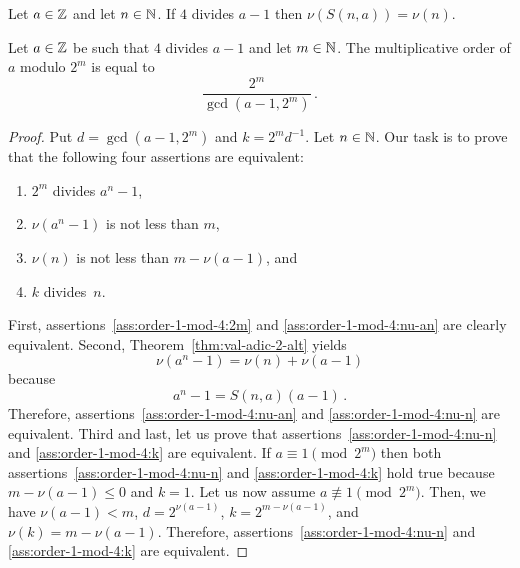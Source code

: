 \begin{theorem} \label{thm:val-adic-2-alt} 
  Let $a \in \mathbb{Z}$ and let $n \in \mathbb{N}$.
  If $4$ divides $a - 1$ then $\nu(S(n, a)) = \nu(n)$.
\end{theorem}



\begin{theorem} \label{thm:order-un-mod-4} 
  Let $a \in \mathbb{Z}$ be such that $4$ divides $a - 1$ and let $m \in \mathbb{N}$.
  The multiplicative order of $a$ modulo $2^m$ is equal to
  $$
  \frac{2^m}{\gcd(a - 1, 2^m)} \,.
  $$
\end{theorem}

\begin{proof}
  Put $d = \gcd(a - 1, 2^m)$ and $k = 2^m d^{-1}$.
  Let $n \in \mathbb{N}$.
  Our task is to prove that the following four assertions are equivalent:
  \begin{enumerate}
    \item $2^m$ divides $a^n - 1$, \label{ass:order-1-mod-4:2m} 
    \item $\nu(a^n - 1)$ is not less than $m$, \label{ass:order-1-mod-4:nu-an} 
    \item $\nu(n)$ is not less than $m - \nu(a - 1)$, and \label{ass:order-1-mod-4:nu-n} 
    \item $k$ divides~$n$. \label{ass:order-1-mod-4:k} 
  \end{enumerate} 
  First,
  assertions~\ref{ass:order-1-mod-4:2m} and \ref{ass:order-1-mod-4:nu-an} are clearly equivalent.
  Second,
  Theorem~\ref{thm:val-adic-2-alt} yields
  $$
  \nu(a^n  - 1) = \nu(n) + \nu(a - 1)
  $$
  because
  $$
  a^n  - 1 = S(n, a) (a - 1) \, . 
  $$
  Therefore,
  assertions~\ref{ass:order-1-mod-4:nu-an} and \ref{ass:order-1-mod-4:nu-n} are equivalent.
  Third and last,
  let us prove that
  assertions~\ref{ass:order-1-mod-4:nu-n} and \ref{ass:order-1-mod-4:k} are equivalent. 
  If $a \equiv 1 \pmod{2^m}$
  then both assertions~\ref{ass:order-1-mod-4:nu-n} and \ref{ass:order-1-mod-4:k} hold true
  because $m - \nu(a - 1) \le 0$ and $k = 1$.
  Let us now assume $a \not \equiv 1 \pmod{2^m}$.
  Then, we have
  $\nu(a - 1) < m$,
  $d = 2^{\nu(a - 1)}$, 
  $k = 2^{m - \nu(a - 1)}$, and
  $\nu(k) = m - \nu(a - 1)$.
  Therefore, assertions~\ref{ass:order-1-mod-4:nu-n} and \ref{ass:order-1-mod-4:k} are equivalent.
\end{proof}






